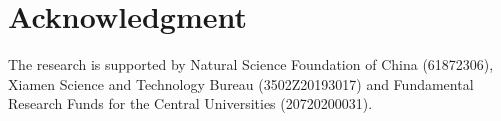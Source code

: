 \documentclass[10pt,journal,compsoc]{IEEEtran}
\begin{document}
\section*{Acknowledgment}

The research is supported by Natural Science Foundation of China (61872306), Xiamen Science and Technology Bureau (3502Z20193017) and Fundamental Research Funds for the Central Universities (20720200031).

%
%



%
%
\end{document}
